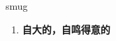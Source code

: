 
\begin{frame}
{\huge smug}
\begin{center}
\begin{enumerate}\Large
  \item \textbf{自大的，自鸣得意的}
\end{enumerate}
\end{center}
\end{frame}
